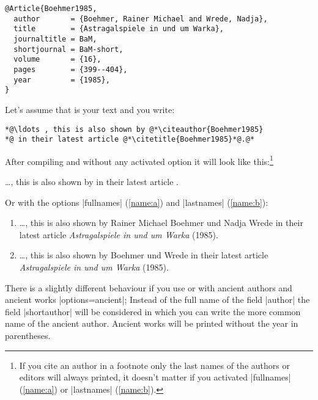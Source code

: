 \documentclass[a4paper,
10pt,
greek,
french,
spanish,
italian,
ngerman,
english
]{ltxdoc}
\begin{document}
\begin{lstlisting}[style=bibentry,label=Boehmer1985,caption={{@}Article\{Boehmer1985,…\} }]
@Article{Boehmer1985,
  author       = {Boehmer, Rainer Michael and Wrede, Nadja},
  title        = {Astragalspiele in und um Warka},
  journaltitle = BaM,
  shortjournal = BaM-short,
  volume       = {16},
  pages        = {399--404},
  year         = {1985},
}
\end{lstlisting}

Let’s assume that is your text and you write:
\begin{refsection}
\begin{lstlisting}
*@\ldots , this is also shown by @*\citeauthor{Boehmer1985} 
*@ in their latest article @*\citetitle{Boehmer1985}*@.@* \end{lstlisting}

After compiling and without any activated option it will look like this:\footnote{If you cite an author in a footnote only the last names of the authors or editors will always printed,
it doesn’t matter if you activated |fullnames| (\cref{name:a}) or |lastnames| (\cref{name:b}).
}

\begin{bsp} 
\ldots , this is also shown by  \citeauthor{Boehmer1985} in their latest article .
\end{bsp}

Or with the options |fullnames| (\cref{name:a}) and |lastnames| (\cref{name:b}):
\begin{bsp}
 \begin{enumerate}
\item\label{name:a} 
 \ldots , this is also shown by  {\color{red}Rainer Michael Boehmer  und Nadja Wrede} in their latest article \emph{Astragalspiele in und um Warka} (1985).
\item\label{name:b}  
\ldots ,  this is also shown by  {\color{red}Boehmer und  Wrede} in their latest article \emph{Astragalspiele in und um Warka} (1985).

 \end{enumerate}
\end{bsp}
\end{refsection}

There is a slightly different behaviour if you use   or   with ancient authors and ancient works |options={ancient}|;
Instead of the full name of the field |author| the field |shortauthor| will be considered in which you can write the more common name of the ancient author.
Ancient works will be printed without the year in parentheses.
\end{document}
